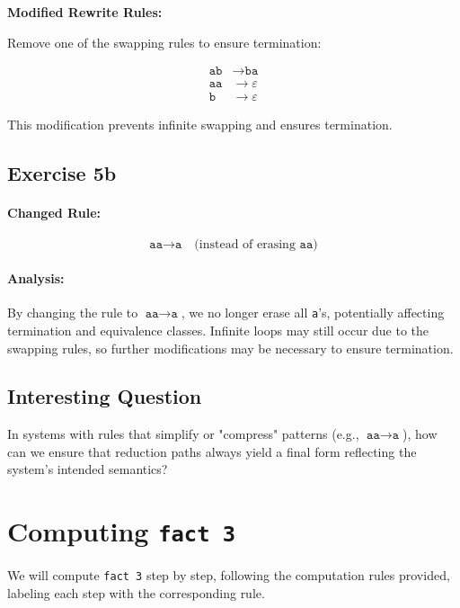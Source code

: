 \documentclass{article}
\theoremstyle{theorem}
\theoremstyle{definition}
\theoremstyle{remark}
\begin{document}
\textbf{Modified Rewrite Rules:}

Remove one of the swapping rules to ensure termination:

\[
\begin{aligned}
\texttt{ab} &\to \texttt{ba} \\
\texttt{aa} &\to \varepsilon \\
\texttt{b} &\to \varepsilon
\end{aligned}
\]

This modification prevents infinite swapping and ensures termination.

\subsection*{Exercise 5b}

\paragraph{Changed Rule:}

\[
\texttt{aa} \to \texttt{a} \quad \text{(instead of erasing } \texttt{aa}\text{)}
\]

\paragraph{Analysis:}

By changing the rule to \(\texttt{aa} \to \texttt{a}\), we no longer erase all \texttt{a}'s, potentially affecting termination and equivalence classes. Infinite loops may still occur due to the swapping rules, so further modifications may be necessary to ensure termination.

\subsection{Interesting Question}
In systems with rules that simplify or "compress" patterns (e.g., \(\texttt{aa} \to \texttt{a}\)), how can we ensure that reduction paths always yield a final form reflecting the system’s intended semantics?

\section{Computing \texttt{fact 3}}

\newcommand{\fix}{\mathrm{fix}}

We will compute \texttt{fact 3} step by step, following the computation rules provided, labeling each step with the corresponding rule.
\end{document}
